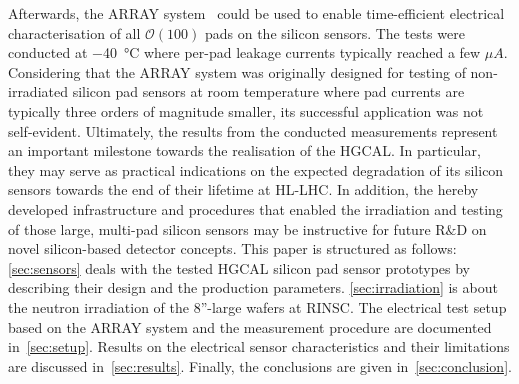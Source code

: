 Afterwards, the ARRAY system~\cite{pitters:array2019} could be used to enable time-efficient electrical characterisation of all $\mathcal{O}(100)$ pads on the silicon sensors.
The tests were conducted at \SI{-40}{\celsius} where per-pad leakage currents typically reached a few $\mu A$.
Considering that the ARRAY system was originally designed for testing of non-irradiated silicon pad sensors at room temperature where pad currents are typically three orders of magnitude smaller, its successful application was not self-evident.
Ultimately, the results from the conducted measurements represent an important milestone towards the realisation of the HGCAL.
In particular, they may serve as practical indications on the expected degradation of its silicon sensors towards the end of their lifetime at HL-LHC. 
In addition, the hereby developed infrastructure and procedures that enabled the irradiation and testing of those large, multi-pad silicon sensors may be instructive for future R$\&$D on novel silicon-based detector concepts.
This paper is structured as follows:
\ref{sec:sensors} deals with the tested HGCAL silicon pad sensor prototypes by describing their design and the production parameters.
\ref{sec:irradiation} is about the neutron irradiation of the 8''-large wafers at RINSC. 
The electrical test setup based on the ARRAY system and the measurement procedure are documented in~\ref{sec:setup}.
Results on the electrical sensor characteristics and their limitations are discussed in~\ref{sec:results}.
Finally, the conclusions are given in~\ref{sec:conclusion}.